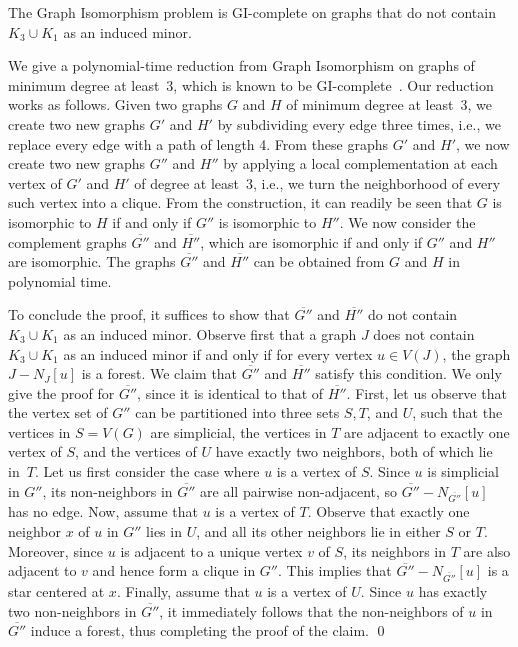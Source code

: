 \documentclass[envcountsame,envcountsect,11pt,a4paper]{llncs}
\renewenvironment{proof}{\begin{Proof}}{\qed\end{Proof}}
\begin{document}
\begin{theorem}
\label{thm:K3uK1}
The {\sc Graph Isomorphism} problem is GI-complete on graphs that do not contain $K_3 \cup K_1$ as an induced minor.
\end{theorem}
\begin{proof}
We give a polynomial-time reduction from {\sc Graph Isomorphism} on graphs of minimum degree at least~3,
which is known to be GI-complete~\cite{BoothColbourn1979}.
Our reduction works as follows. Given two graphs $G$ and $H$ of minimum degree at least~3, we create two new graphs $G'$ and $H'$ by
subdividing every edge three times, i.e., we replace every edge with a path of length 4. From these graphs $G'$ and $H'$, we now create two
new graphs $G''$ and $H''$ by applying a local complementation at each vertex of $G'$ and $H'$ of degree at least~3, i.e., we turn the
neighborhood of every such vertex into a clique.  From the construction, it can readily be seen that $G$ is isomorphic to $H$ if and only if
$G''$ is isomorphic to $H''$. We now consider the complement graphs $\overline{G''}$ and $\overline{H''}$, which are isomorphic if and only
if $G''$ and $H''$ are isomorphic.
The graphs $\overline{G''}$ and $\overline{H''}$ can be obtained from $G$ and $H$ in polynomial time.

To conclude the proof, it suffices to show that $\overline{G''}$ and $\overline{H''}$ do not contain $K_3 \cup K_1$ as an induced minor.
Observe first that a graph $J$ does not contain $K_3 \cup K_1$ as an induced minor if and only if for every vertex $u \in V(J)$, the graph
$J - N_{J}[u]$ is a forest.  We claim that $\overline{G''}$ and $\overline{H''}$ satisfy this condition. We only give the proof for
$\overline{G''}$, since it is identical to that of $\overline{H''}$.
First, let us observe that the vertex set of $G''$ can be partitioned into three sets $S,T$, and $U$,
such that the vertices in $S = V(G)$ are simplicial, the vertices in $T$ are adjacent to exactly one vertex of $S$, and the vertices of $U$ have
 exactly two neighbors, both of which lie in~$T$. Let us first consider the case where $u$ is a vertex of $S$.
Since $u$ is simplicial in $G''$, its non-neighbors in $\overline{G''}$ are all pairwise non-adjacent,
so $\overline{G''} - N_{\overline{G''}}[u]$ has no edge.
Now, assume that $u$ is a vertex of $T$. Observe that exactly one neighbor $x$ of $u$ in $G''$ lies in $U$, and all its other neighbors lie
in either $S$ or $T$. Moreover, since $u$ is adjacent to a unique vertex $v$ of $S$, its neighbors in $T$ are also adjacent to $v$ and hence
form a clique in $G''$. This implies that $\overline{G''} - N_{\overline{G''}}[u]$ is a star centered at $x$.
Finally, assume that $u$ is a vertex of $U$. Since $u$ has exactly two non-neighbors in $\overline{G''}$,
it immediately follows that the non-neighbors of $u$ in $\overline{G''}$ induce a forest, thus completing the proof of the claim.
\end{proof}
\end{document}
